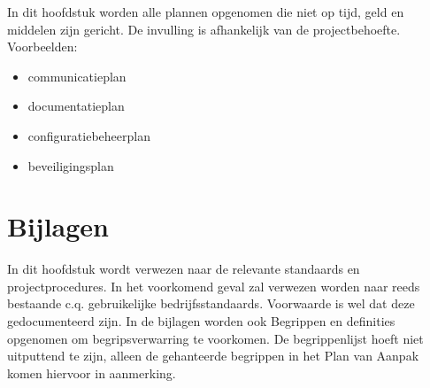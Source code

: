 \documentclass{article}
\begin{document}
In dit hoofdstuk worden alle plannen opgenomen die niet op tijd, geld en middelen zijn gericht.
De invulling is afhankelijk van de projectbehoefte.
Voorbeelden:
\begin{itemize}
  \item communicatieplan
  \item documentatieplan
  \item configuratiebeheerplan
  \item beveiligingsplan
\end{itemize}

\section{Bijlagen}
In dit hoofdstuk wordt verwezen naar de relevante standaards en projectprocedures.
In het voorkomend geval zal verwezen worden naar reeds bestaande c.q. gebruikelijke bedrijfsstandaards.
Voorwaarde is wel dat deze gedocumenteerd zijn.
In de bijlagen worden ook Begrippen en definities opgenomen om begripsverwarring te voorkomen.
De begrippenlijst hoeft niet uitputtend te zijn, alleen de gehanteerde begrippen in het Plan van Aanpak komen hiervoor in aanmerking.


%
%
\end{document}
